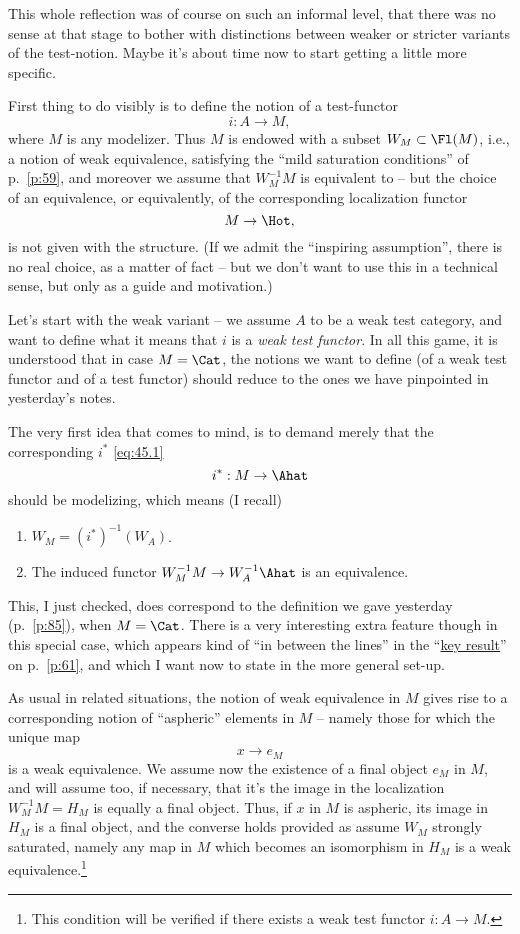 This whole reflection was of course on such an informal level, that
there was no sense at that stage to bother with distinctions between
weaker or stricter variants of the test-notion. Maybe it's about time
now to start getting a little more specific.

\label{sec:46}%
First thing to do visibly is to define the notion of a test-functor
\[ i : A \to M,\]
where $M$ is any modelizer. Thus $M$ is endowed with a subset
$W_M\subset\Fl(M)$, i.e., a notion of weak equivalence, satisfying the
``mild saturation conditions'' of p.\ \ref{p:59}, and moreover we
assume that $W_M^{-1}M$ is equivalent to \Hot{} -- but the choice of
an equivalence, or equivalently, of the corresponding localization
functor
\[ M \to \Hot,\]
is not given with the structure. (If we admit the ``inspiring
assumption'', there is no real choice, as a matter of fact -- but we
don't want to use this in a technical sense, but only as a guide and
motivation.)

Let's start with the weak variant -- we assume $A$ to be a weak test
category, and want to define what it means that $i$ is a \emph{weak
  test functor}. In all this game, it is understood that in case
$M=\Cat$, the notions we want to define (of a weak test functor and of
a test functor) should reduce to the ones we have pinpointed in
yesterday's notes.

The very first idea that comes to mind, is to demand merely that the
corresponding $i^*$ \eqref{eq:45.1}
\[ i^*: M\to\Ahat\]
should be modelizing, which means (I recall)
\begin{enumerate}[label=\alph*)]
\item $W_M= (i^*)^{-1}(W_A)$.
\item The induced functor $W_M^{-1}M \to W_A^{-1}\Ahat$ is an
  equivalence.
\end{enumerate}

This, I just checked, does correspond to the definition we gave
yesterday (p.\ \ref{p:85}), when $M=\Cat$. There is a very interesting
extra feature though in this special case, which appears kind of ``in
between the lines'' in the ``\hyperref[thm:keyresult]{key result}'' on
p.\ \ref{p:61}, and which I want now to state in the more general
set-up.

As usual in related situations, the notion of weak equivalence in $M$
gives rise to a corresponding notion of ``aspheric'' elements in $M$
-- namely those for which the unique map
\[x \to e_M\]
is a weak equivalence. We assume now the existence of a final object
$e_M$ in $M$, and will assume too, if necessary, that it's the image
in the localization $W_M^{-1}M= H_M$ is equally a final object. Thus,
if $x$ in $M$ is aspheric, its image in $H_M$ is a final object, and
the converse holds provided as assume $W_M$ strongly saturated, namely
any map in $M$ which becomes an isomorphism in $H_M$ is a weak
equivalence.\footnote{ This condition will be verified if there
  exists a weak test functor $i:A\to M$.}

